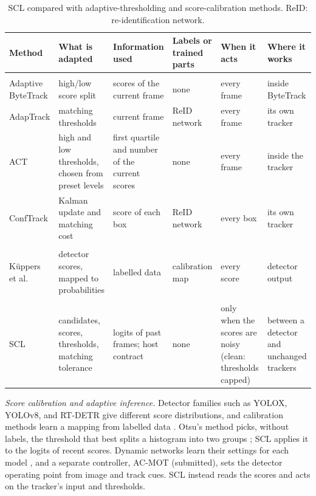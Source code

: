 \documentclass[pdflatex,sn-mathphys-num,iicol]{sn-jnl}
\newcommand{\scl}{SCL}
\begin{document}
\begin{table}[!tp]
\caption{\scl{} compared with adaptive-thresholding and score-calibration methods. ReID:
re-identification network.}
\label{tab:compare}
\centering\footnotesize
\setlength{\tabcolsep}{3pt}
\begin{tabular}{@{}>{\raggedright\arraybackslash}p{23mm}>{\raggedright\arraybackslash}p{28mm}>{\raggedright\arraybackslash}p{28mm}>{\raggedright\arraybackslash}p{19mm}>{\raggedright\arraybackslash}p{24mm}>{\raggedright\arraybackslash}p{25mm}@{}}
\toprule
Method & What is adapted & Information used & Labels or trained parts & When it acts & Where it works\\
\midrule
\multicolumn{6}{@{}l}{\textit{Adaptive thresholding}}\\
Adaptive ByteTrack \cite{ma2023adaptivebytetrack} & high/low score split & scores of the current frame & none & every frame & inside ByteTrack\\
AdapTrack \cite{shim2024adaptrack} & matching thresholds & current frame & ReID network & every frame & its own tracker\\
ACT \cite{act2026adaptive} & high and low thresholds, chosen from preset levels & first quartile and number of the current scores & none & every frame & inside the tracker\\
ConfTrack \cite{jung2024conftrack} & Kalman update and matching cost & score of each box & ReID network & every box & its own tracker\\
\addlinespace[3pt]
\multicolumn{6}{@{}l}{\textit{Score calibration}}\\
K{\"u}ppers et al.\ \cite{kuppers2020detcalib} & detector scores, mapped to probabilities & labelled data & calibration map & every score & detector output\\
\addlinespace[3pt]
\multicolumn{6}{@{}l}{\textit{This paper}}\\
\scl{} & candidates, scores, thresholds, matching tolerance & logits of past frames; host contract & none & only when the scores are noisy (clean: thresholds capped) & between a detector and unchanged trackers\\
\bottomrule
\end{tabular}
\end{table}

\emph{Score calibration and adaptive inference.} Detector families such as YOLOX, YOLOv8, and RT-DETR give different score distributions,
and calibration methods learn a mapping from labelled data \cite{kuppers2020detcalib}. Otsu's
method picks, without labels, the threshold that best splits a histogram into two groups
\cite{otsu1979}; \scl{} applies it to the logits of recent scores. Dynamic networks learn their
settings for each model \cite{han2022dynamic}, and a separate controller, AC-MOT (submitted), sets the detector operating point from
image and track cues. \scl{} instead reads the scores and acts on the tracker's input and
thresholds.
\end{document}
